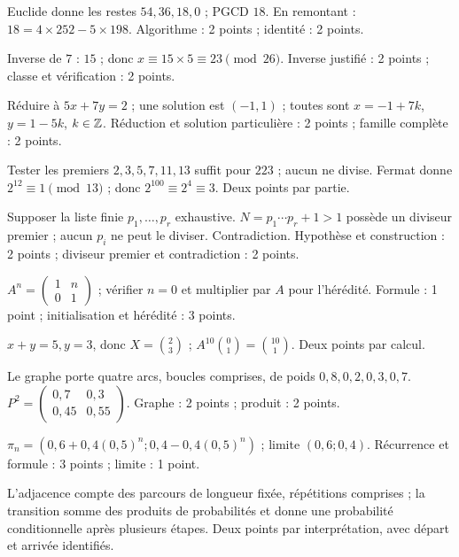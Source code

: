 \clearpage\par\addvspace{6mm}\label{evaluation-cor-2}
\begin{questions}
\item Euclide donne les restes $54,36,18,0$ ; PGCD $18$. En remontant : $18=4\times252-5\times198$. Algorithme : 2 points ; identité : 2 points.
\item Inverse de $7$ : $15$ ; donc $x\equiv15\times5\equiv23\pmod{26}$. Inverse justifié : 2 points ; classe et vérification : 2 points.
\item Réduire à $5x+7y=2$ ; une solution est $(-1,1)$ ; toutes sont $x=-1+7k$, $y=1-5k$, $k\in\mathbb{Z}$. Réduction et solution particulière : 2 points ; famille complète : 2 points.
\item Tester les premiers $2,3,5,7,11,13$ suffit pour $223$ ; aucun ne divise. Fermat donne $2^{12}\equiv1\pmod{13}$ ; donc $2^{100}\equiv2^4\equiv3$. Deux points par partie.
\item Supposer la liste finie $p_1,\ldots,p_r$ exhaustive. $N=p_1\cdots p_r+1>1$ possède un diviseur premier ; aucun $p_i$ ne peut le diviser. Contradiction. Hypothèse et construction : 2 points ; diviseur premier et contradiction : 2 points.
\end{questions}
\clearpage\par\addvspace{6mm}\label{evaluation-cor-3}
\begin{questions}
\item $A^n=\left(\begin{smallmatrix}1&n\\0&1\end{smallmatrix}\right)$ ; vérifier $n=0$ et multiplier par $A$ pour l’hérédité. Formule : 1 point ; initialisation et hérédité : 3 points.
\item $x+y=5,y=3$, donc $X=\binom23$ ; $A^{10}\binom01=\binom{10}1$. Deux points par calcul.
\item Le graphe porte quatre arcs, boucles comprises, de poids $0{,}8,0{,}2,0{,}3,0{,}7$. $P^2=\left(\begin{smallmatrix}0{,}7&0{,}3\\0{,}45&0{,}55\end{smallmatrix}\right)$. Graphe : 2 points ; produit : 2 points.
\item $\pi_n=(0{,}6+0{,}4(0{,}5)^n;0{,}4-0{,}4(0{,}5)^n)$ ; limite $(0{,}6;0{,}4)$. Récurrence et formule : 3 points ; limite : 1 point.
\item L’adjacence compte des parcours de longueur fixée, répétitions comprises ; la transition somme des produits de probabilités et donne une probabilité conditionnelle après plusieurs étapes. Deux points par interprétation, avec départ et arrivée identifiés.
\end{questions}
